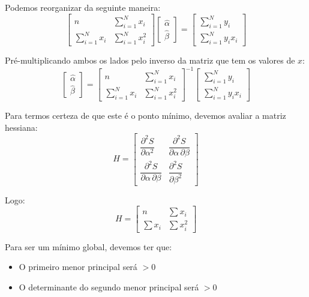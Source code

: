\documentclass[
  letterpaper,
  DIV=11,
  numbers=noendperiod]{scrreprt}
\providecommand{\tightlist}{%
  \setlength{\itemsep}{0pt}\setlength{\parskip}{0pt}}\usepackage{longtable,booktabs,array}
\theoremstyle{definition}
\theoremstyle{plain}
\theoremstyle{remark}
\begin{document}
Podemos reorganizar da seguinte maneira: \[
\begin{bmatrix}
n & \sum_{i=1}^{N} x_{i} \\
\sum_{i=1}^{N} x_{i} & \sum_{i=1}^{N} x_{i}^{2}
\end{bmatrix}
\begin{bmatrix}
\hat{\alpha} \\
\hat{\beta}
\end{bmatrix}
=
\begin{bmatrix}
\sum_{i=1}^{N} y_{i} \\
\sum_{i=1}^{N} y_{i}x_{i}
\end{bmatrix}
\]

Pré-multiplicando ambos os lados pelo inverso da matriz que tem os
valores de \(x\): \[
\begin{bmatrix}
\hat{\alpha} \\
\hat{\beta}
\end{bmatrix}
=
\begin{bmatrix}
n & \sum_{i=1}^{N} x_{i} \\
\sum_{i=1}^{N} x_{i} & \sum_{i=1}^{N} x_{i}^{2}
\end{bmatrix}^{-1}
\begin{bmatrix}
\sum_{i=1}^{N} y_{i} \\
\sum_{i=1}^{N} y_{i}x_{i}
\end{bmatrix}
\]

Para termos certeza de que este é o ponto mínimo, devemos avaliar a
matriz hessiana: \[
H =
\begin{bmatrix}
\dfrac{\partial^2 S}{\partial \alpha^2} & \dfrac{\partial^2 S}{\partial \alpha \, \partial \beta} \\
\dfrac{\partial^2 S}{\partial \alpha \, \partial \beta} & \dfrac{\partial^2 S}{\partial \beta^2}
\end{bmatrix}
\]

Logo: \[
H =
\begin{bmatrix}
n & \sum x_{i} \\
\sum x_{i} & \sum x_{i}^{2}
\end{bmatrix}
\]

Para ser um mínimo global, devemos ter que:

\begin{itemize}
\tightlist
\item
  O primeiro menor principal será \(> 0\)
\item
  O determinante do segundo menor principal será \(>0\)
\end{itemize}
\end{document}
